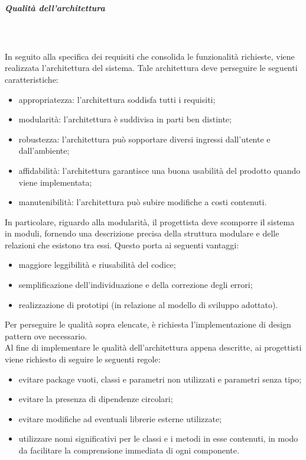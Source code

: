 				\subparagraph{Qualità dell'architettura} \mbox{} \\ \mbox{} \\
				In seguito alla specifica dei requisiti che consolida le funzionalità richieste, viene realizzata l'architettura del sistema. Tale architettura deve perseguire le seguenti caratteristiche: \begin{itemize}
				\item appropriatezza: l'architettura soddisfa tutti i requisiti;
				\item modularità: l'architettura è suddivisa in parti ben distinte;
				\item robustezza: l'architettura può sopportare diversi ingressi dall'utente e dall'ambiente;
				\item affidabilità: l'architettura garantisce una buona usabilità del prodotto quando viene implementata;
				\item manutenibilità: l'architettura può subire modifiche a costi contenuti.
				\end{itemize}
				In particolare, riguardo alla modularità, il progettista deve scomporre il sistema in moduli, fornendo una descrizione precisa della struttura modulare e delle relazioni che esistono tra essi.
Questo porta ai seguenti vantaggi: \begin{itemize}
\item maggiore leggibilità e riusabilità del codice;
\item semplificazione dell'individuazione e della correzione degli errori;
\item realizzazione di prototipi (in relazione al modello di sviluppo adottato).
\end{itemize}
Per perseguire le qualità sopra elencate, è richiesta l'implementazione di design pattern ove necessario.\\
Al fine di implementare le qualità dell'architettura appena descritte, ai progettisti viene richiesto di seguire le seguenti regole: \begin{itemize}
\item evitare package vuoti, classi e parametri non utilizzati e parametri senza tipo;
\item evitare la presenza di dipendenze circolari;
\item evitare modifiche ad eventuali librerie esterne utilizzate;
\item utilizzare nomi significativi per le classi e i metodi in esse contenuti, in modo da facilitare la comprensione immediata di ogni componente.
\end{itemize}

